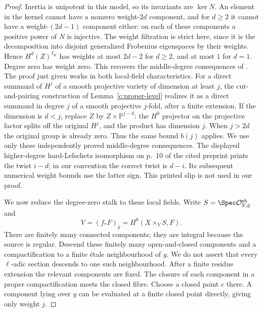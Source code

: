 \begin{proof}
Inertia is unipotent in this model, so its invariants are $\ker N$.
An element in the kernel cannot have a nonzero weight-$2d$ component,
and for $d\geq2$ it cannot have a weight-$(2d-1)$ component either:
on each of these components a positive power of $N$ is injective.
The weight filtration is strict here, since it is the decomposition
into disjoint generalized Frobenius eigenspaces by their weights.
Hence $H^d(Z)^{I_K}$ has weights at most $2d-2$ for $d\geq2$, and
at most $1$ for $d=1$.  Degree zero has weight zero.  This recovers
the middle-degree consequences of
\citet[Theorem~1.6 and Proposition~1.8, pp.~9--11]{c_yamamura2026weights}.
The proof just given works in both local-field characteristics.
For a direct summand of $H^j$ of a smooth projective variety of
dimension at least $j$, the cut-and-pairing construction of
Lemma~\ref{c:proper-level} realizes it as a direct summand in degree
$j$ of a smooth projective $j$-fold, after a finite extension.
If the dimension is $d<j$, replace $Z$ by
$Z\times\mathbb P^{j-d}$: the $H^0$ projector on the projective
factor splits off the original $H^j$, and the product has dimension
$j$.  When $j>2d$ the original group is already zero.
Thus the same bound $b(j)$ applies.
We use only these independently proved middle-degree consequences.
The displayed higher-degree hard-Lefschetz isomorphism on p.~10
of the cited preprint prints the twist $i-d$; in our convention
the correct twist is $d-i$.  Its subsequent numerical weight bounds
use the latter sign.  This printed slip is not used in our proof.

We now reduce the degree-zero stalk to these local fields.
Write $S=\Spec\mathcal O_{Y,\bar y}^{\mathrm{sh}}$ and
\[
 V=(f_*F)_{\bar y}=H^0(X\times_Y S,F).
\]
There are finitely many connected components; they are integral
because the source is regular.  Descend these finitely many
open-and-closed components and a compactification to a finite
\'etale neighbourhood of $y$.  We do not assert that every
$\ell$-adic section descends to one such neighbourhood.
After a finite residue extension the relevant components are fixed.
The closure of each component in a proper compactification meets
the closed fibre.  Choose a closed point $c$ there.  A component
lying over $y$ can be evaluated at a finite closed point directly,
giving only weight $j$.


\end{proof}
